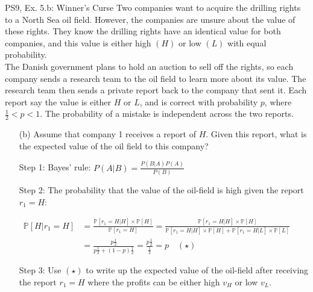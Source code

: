 \begin{frame}{PS9, Ex. 5.b: Winner's Curse}
      Two companies want to acquire the drilling rights to a North Sea oil field. However, the companies are unsure about the value of these rights. They know the drilling rights have an identical value for both companies, and this value is either high $(H)$ or low $(L)$ with equal probability.\\\smallskip
      The Danish government plans to hold an auction to sell off the rights, so each company sends a research team to the oil field to learn more about its value. The research team then sends a private report back to the company that sent it. Each report say the value is either $H$ or $L$, and is correct with probability $p$, where $\frac{1}{2} < p < 1$. The probability of a mistake is independent across the two reports.
      \begin{itemize}
        \item[(b)] Assume that company 1 receives a report of $H$. Given this report, what is the expected value of the oil field to this company?
        \item[Step 1:] Bayes' rule: $P(A|B)=\frac{P(B|A)P(A)}{P(B)}$
        \item[Step 2:] The probability that the value of the oil-field is high given the report $r_1=H$:
      \end{itemize}
      \vspace{-8pt}
      \begin{align*}
        \mathbb{P}[H|r_1=H]
        &=\frac{\mathbb{P}[r_1=H|H]\times\mathbb{P}[H]}{\mathbb{P}[r_1=H]}
        =\frac{\mathbb{P}[r_1=H|H]\times\mathbb{P}[H]}{\mathbb{P}[r_1=H|H]\times\mathbb{P}[H]+\mathbb{P}[r_1=H|L]\times\mathbb{P}[L]}\\
        &=\frac{p\frac{1}{2}}{p\frac{1}{2}+(1-p)\frac{1}{2}}=\frac{p\frac{1}{2}}{\frac{1}{2}}=p\quad (\star)
      \end{align*}
      \vspace{-10pt}
      \begin{itemize}
        \item[Step 3:] Use $(\star)$ to write up the expected value of the oil-field after receiving the report $r_1=H$ where the profits can be either high $v_H$ or low $v_L$.
      \end{itemize}
      \vfill\null
\end{frame}
